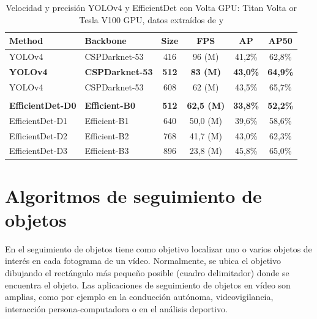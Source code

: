 \begin{table}[ht]
\centering
\caption{Velocidad y precisión YOLOv4 y EfficientDet con Volta GPU: Titan Volta or Tesla V100 GPU, datos extraídos de \cite{bochkovskiy2020yolov4} y \cite{tan2020efficientdet}}
\label{tab:volta-speed-accuracy}
\begin{tabular}{llcccc}
\hline
\textbf{Method}          & \textbf{Backbone}      & \textbf{Size}        & \textbf{FPS}         & \textbf{AP}          & \textbf{AP50}        \\ \hline
YOLOv4                   & CSPDarknet-53          & 416                  & 96 (M)               & 41,2\%               & 62,8\%               \\
\textbf{YOLOv4}          & \textbf{CSPDarknet-53} & \textbf{512}         & \textbf{83 (M)}      & \textbf{43,0\%}      & \textbf{64,9\%}      \\
YOLOv4                   & CSPDarknet-53          & 608                  & 62 (M)               & 43,5\%               & 65,7\%               \\
                         &                        & \multicolumn{1}{l}{} & \multicolumn{1}{l}{} & \multicolumn{1}{l}{} & \multicolumn{1}{l}{} \\
\textbf{EfficientDet-D0} & \textbf{Efficient-B0}  & \textbf{512}         & \textbf{62,5 (M)}    & \textbf{33,8\%}      & \textbf{52,2\%}      \\
EfficientDet-D1          & Efficient-B1           & 640                  & 50,0 (M)             & 39,6\%               & 58,6\%               \\
EfficientDet-D2          & Efficient-B2           & 768                  & 41,7 (M)             & 43,0\%               & 62,3\%               \\
EfficientDet-D3          & Efficient-B3           & 896                  & 23,8 (M)             & 45,8\%               & 65,0\%               \\ \hline
\end{tabular}
\end{table}

\newpage

\section{Algoritmos de seguimiento de objetos}
\label{sec:tecnicas-utilizadas-tracking}

En el seguimiento de objetos tiene como objetivo localizar uno o varios objetos de interés en cada fotograma de un vídeo. Normalmente, se ubica el objetivo dibujando el rectángulo más pequeño posible (cuadro delimitador) donde se encuentra el objeto. Las aplicaciones de seguimiento de objetos en vídeo son amplias, como por ejemplo en la conducción autónoma, videovigilancia, interacción persona-computadora o en el análisis deportivo.

